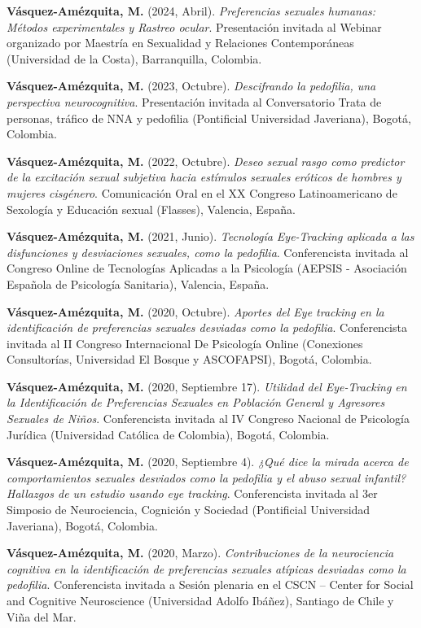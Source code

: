 \documentclass[11pt,a4paper,]{awesome-cv}
\begin{document}
\textbf{Vásquez-Amézquita, M.} (2024, Abril). \emph{Preferencias
sexuales humanas: Métodos experimentales y Rastreo ocular}. Presentación
invitada al Webinar organizado por Maestría en Sexualidad y Relaciones
Contemporáneas (Universidad de la Costa), Barranquilla, Colombia.

\textbf{Vásquez-Amézquita, M.} (2023, Octubre). \emph{Descifrando la
pedofilia, una perspectiva neurocognitiva}. Presentación invitada al
Conversatorio Trata de personas, tráfico de NNA y pedofilia (Pontificial
Universidad Javeriana), Bogotá, Colombia.

\textbf{Vásquez-Amézquita, M.} (2022, Octubre). \emph{Deseo sexual rasgo
como predictor de la excitación sexual subjetiva hacia estímulos
sexuales eróticos de hombres y mujeres cisgénero}. Comunicación Oral en
el XX Congreso Latinoamericano de Sexología y Educación sexual
(Flasses), Valencia, España.

\textbf{Vásquez-Amézquita, M.} (2021, Junio). \emph{Tecnología
Eye-Tracking aplicada a las disfunciones y desviaciones sexuales, como
la pedofilia}. Conferencista invitada al Congreso Online de Tecnologías
Aplicadas a la Psicología (AEPSIS - Asociación Española de Psicología
Sanitaria), Valencia, España.

\textbf{Vásquez-Amézquita, M.} (2020, Octubre). \emph{Aportes del Eye
tracking en la identificación de preferencias sexuales desviadas como la
pedofilia}. Conferencista invitada al II Congreso Internacional De
Psicología Online (Conexiones Consultorías, Universidad El Bosque y
ASCOFAPSI), Bogotá, Colombia.

\textbf{Vásquez-Amézquita, M.} (2020, Septiembre 17). \emph{Utilidad del
Eye-Tracking en la Identificación de Preferencias Sexuales en Población
General y Agresores Sexuales de Niños}. Conferencista invitada al IV
Congreso Nacional de Psicología Jurídica (Universidad Católica de
Colombia), Bogotá, Colombia.

\textbf{Vásquez-Amézquita, M.} (2020, Septiembre 4). \emph{¿Qué dice la
mirada acerca de comportamientos sexuales desviados como la pedofilia y
el abuso sexual infantil? Hallazgos de un estudio usando eye tracking}.
Conferencista invitada al 3er Simposio de Neurociencia, Cognición y
Sociedad (Pontificial Universidad Javeriana), Bogotá, Colombia.

\textbf{Vásquez-Amézquita, M.} (2020, Marzo). \emph{Contribuciones de la
neurociencia cognitiva en la identificación de preferencias sexuales
atípicas desviadas como la pedofilia}. Conferencista invitada a Sesión
plenaria en el CSCN -- Center for Social and Cognitive Neuroscience
(Universidad Adolfo Ibáñez), Santiago de Chile y Viña del Mar.
\end{document}
